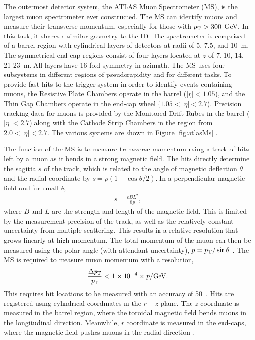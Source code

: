 The outermost detector system, the ATLAS Muon Spectrometer (MS), is the largest muon spectrometer ever constructed.
The MS can identify muons and measure their transverse momentum, especially for those with $p_\text{T}>300$~GeV.
In this task, it shares a similar geometry to the ID.
The spectrometer is comprised of a barrel region with cylindrical layers of detectors at radii of 5, 7.5, and 10~m.
The symmetrical end-cap regions consist of four layers located at $z$ of 7, 10, 14, 21-23~m.
All layers have 16-fold symmetry in azimuth.
The MS uses four subsystems in different regions of pseudorapidity and for different tasks.
To provide fast hits to the trigger system in order to identify events containing muons, the Resistive Plate Chambers operate in the barrel ($|\eta|<1.05$), and the Thin Gap Chambers operate in the end-cap wheel ($1.05<|\eta|<2.7$).
Precision tracking data for muons is provided by the Monitored Drift Rubes in the barrel ($|\eta|<2.7$) along with the Cathode Strip Chambers in the region from $2.0<|\eta|<2.7$.
The various systems are shown in Figure \ref{fig:atlasMs}  \cite{muonTdr}.

The function of the MS is to measure transverse momentum using a track of hits left by a muon as it bends in a strong magnetic field.
The hits directly determine the sagitta $s$ of the track, which is related to the angle of magnetic deflection $\theta$ and the radial coordinate by $s=\rho(1-\cos\theta/2)$.
In a perpendicular magnetic field and for small $\theta$,
\begin{equation}\begin{split}
    s=\frac{eBL^2}{8p},
\end{split}\end{equation}
where $B$ and $L$ are the strength and length of the magnetic field.
This is limited by the measurement precision of the track, as well as the relatively constant uncertainty from multiple-scattering.
This results in a relative resolution that grows linearly at high momentum.
The total momentum of the muon can then be measured using the polar angle (with attendant uncertainty), $p=p_\text{T}/\sin{\theta}$  \cite{grupen}.
The MS is required to measure muon momentum with a resolution,
\begin{equation}\begin{split}
    \frac{\Delta p_\text{T}}{p_\text{T}}<1\times10^{-4}\times p/\text{GeV}.
\end{split}\end{equation}
This requires hit locations to be measured with an accuracy of 50~\um.
Hits are registered using cylindrical coordinates in the $r-z$ plane.
The $z$ coordinate is measured in the barrel region, where the toroidal magnetic field bends muons in the longitudinal direction.
Meanwhile, $r$ coordinate is measured in the end-caps, where the magnetic field pushes muons in the radial direction  \cite{muonTdr}.


